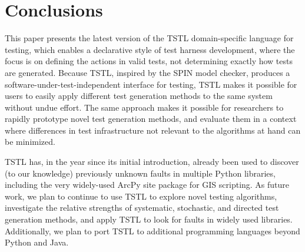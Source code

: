 \section{Conclusions}
\label{conclusion}

This paper presents the latest version of the TSTL
\cite{NFM15,ISSTA15,tstl} domain-specific language for testing, which
enables a declarative style of test harness development, where the
focus is on defining the actions in valid tests, not determining
exactly how tests are generated.  Because TSTL, inspired by the SPIN
model checker, produces a software-under-test-independent interface
for testing, TSTL makes it possible for users to easily apply
different test generation methods to the same system without undue
effort.  The same approach makes it possible for researchers to rapidly prototype novel test generation
methods, and evaluate them in a context where differences in test
infrastructure not relevant to the algorithms at hand can be minimized.

TSTL has, in the year since its initial introduction,
already been used to discover (to our knowledge) previously unknown
faults in multiple Python libraries, including the very widely-used
ArcPy site package for GIS scripting. 
As future work, we plan to continue to use TSTL to explore novel
testing algorithms, investigate the relative strengths of systematic,
stochastic, and directed test generation methods, and apply TSTL to
look for faults in widely used libraries.  Additionally, we plan to
port TSTL to additional
programming languages beyond Python and Java.
